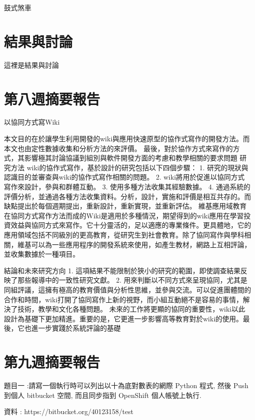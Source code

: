 \documentclass[]{article}
\begin{document}
鼓式煞車

\section{結果與討論}\label{ux7d50ux679cux8207ux8a0eux8ad6-10}

這裡是結果與討論

\section{第八週摘要報告}\label{ux7b2cux516bux9031ux6458ux8981ux5831ux544a}

以協同方式寫Wiki

本文目的在於讓學生利用開發的wiki與應用快速原型的協作式寫作的開發方法。而本文也由定性數據收集和分析方法的來評價。
最後，對於協作方式來寫作的方式，其影響極其討論協議到組別與軟件開發方面的考慮和教學相關的要求問題
研究方法 wiki的協作式寫作，基於設計的研究包括以下四個步驟： 1.
研究的現狀與認識目的並審查與wiki的協作式寫作相關的問題。 2.
wiki將用於促進以協同方式寫作來設計，參與和群體互動。 3.
使用多種方法收集其經驗數據。 4.
通過系統的評價分析，並通過各種方法收集資料。分析，設計，實施和評價是相互共存的。而缺點提出於每個週期提出，重新設計，重新實現，並重新評估。
維基應用域教育在協同方式寫作方法而成的Wiki是適用於多種情況，期望得到的wiki應用在學習投資效益與協同方式來寫作。它十分靈活的，足以適應的專業條件。更具體地，它的應用領域包括不同級別的更高教育，從研究生到社會教育。除了協同寫作與學科相關，維基可以為一些應用程序的開發系統來使用，如產生教材，網路上互相評論，並收集數據於一種項目。

結論和未來研究方向 1.
這項結果不能限制於狹小的研究的範圍，即使調查結果反映了那些報導中的一致性研究文獻。
2.
用來判斷以不同方式來呈現協同，尤其是同組評議，這擁有極高的教育價值與分析性思維，並參與交流。可以促進團體間的合作和時間，wiki打開了協同寫作上新的視野，而小組互動絕不是容易的事情，解決了技術，教學和文化各種問題。
未來的工作將更顯的協同的重要性，wiki以此設計為基礎下更加精進。重要的是，它更進一步影響高等教育對於wiki的使用。最後，它也進一步實踐於系統評論的基礎

\section{第九週摘要報告}\label{ux7b2cux4e5dux9031ux6458ux8981ux5831ux544a}

題目一 :請寫一個執行時可以列出以十為底對數表的網際 Python 程式, 然後
Push 到個人 bitbucket 空間, 而且同步指到 OpenShift 個人帳號上執行.

資料 : https://bitbucket.org/40123158/test
\end{document}
